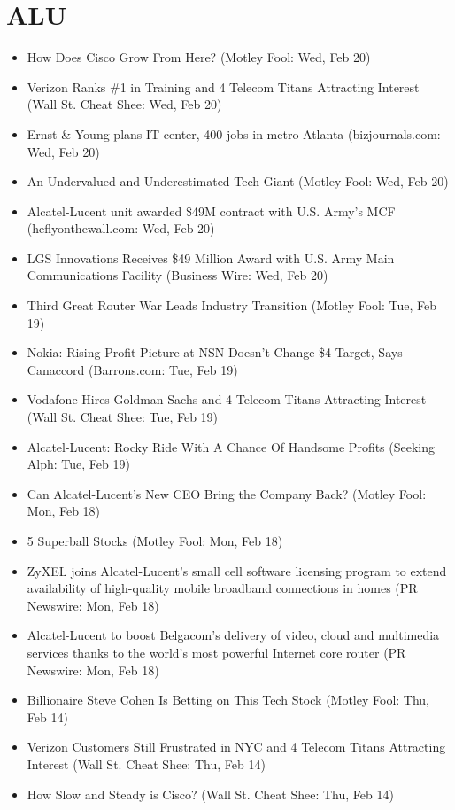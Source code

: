 \documentclass[11pt,asymmetric]{article}
\begin{document}
\section*{ALU}
\begin{itemize}
\item How Does Cisco Grow From Here? (Motley Fool: Wed, Feb 20)
\item Verizon Ranks \#1 in Training and 4 Telecom Titans Attracting Interest (Wall St. Cheat Shee: Wed, Feb 20)
\item Ernst \& Young plans IT center, 400 jobs in metro Atlanta (bizjournals.com: Wed, Feb 20)
\item An Undervalued and Underestimated Tech Giant (Motley Fool: Wed, Feb 20)
\item Alcatel-Lucent unit awarded \$49M contract with U.S. Army's MCF (heflyonthewall.com: Wed, Feb 20)
\item LGS Innovations Receives \$49 Million Award with U.S. Army Main Communications Facility (Business Wire: Wed, Feb 20)
\item Third Great Router War Leads Industry Transition (Motley Fool: Tue, Feb 19)
\item Nokia: Rising Profit Picture at NSN Doesn't Change \$4 Target, Says Canaccord (Barrons.com: Tue, Feb 19)
\item Vodafone Hires Goldman Sachs and 4 Telecom Titans Attracting Interest (Wall St. Cheat Shee: Tue, Feb 19)
\item Alcatel-Lucent: Rocky Ride With A Chance Of Handsome Profits (Seeking Alph: Tue, Feb 19)
\item Can Alcatel-Lucent's New CEO Bring the Company Back? (Motley Fool: Mon, Feb 18)
\item 5 Superball Stocks (Motley Fool: Mon, Feb 18)
\item ZyXEL joins Alcatel-Lucent's small cell software licensing program to extend availability of high-quality mobile broadband connections in homes (PR Newswire: Mon, Feb 18)
\item Alcatel-Lucent to boost Belgacom's delivery of video, cloud and multimedia services thanks to the world's most powerful Internet core router (PR Newswire: Mon, Feb 18)
\item Billionaire Steve Cohen Is Betting on This Tech Stock (Motley Fool: Thu, Feb 14)
\item Verizon Customers Still Frustrated in NYC and 4 Telecom Titans Attracting Interest (Wall St. Cheat Shee: Thu, Feb 14)
\item How Slow and Steady is Cisco? (Wall St. Cheat Shee: Thu, Feb 14)

\end{itemize}
\end{document}
